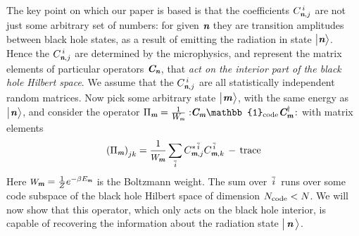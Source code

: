 \documentclass[12pt]{article}%
\def\spc{\hspace{.5pt}}
\def\be{\begin{equation}}
\def\ee{\end{equation}}
\begin{document}
The key point on which our paper is based is that the coefficients $C^{\,i}_{{ \textit{\textbf n}}, j}$ are not just some arbitrary set of numbers: for given ${ \textit{\textbf n}}$ they are transition amplitudes
between black hole states, as a result of emitting the radiation in state $\bigl|{ \textit{\textbf n}}\bigr\rangle$. Hence the $C^{\,i}_{{ \textit{\textbf n}}, j}$ are determined by the microphysics, and
represent the matrix elements of particular operators $\mbox{\textit{\textbf{C}\!\,}}_{ \textit{\textbf n}}$, that {\it act on the interior part of the black hole Hilbert space}. We assume that the $C^{\,i}_{{ \textit{\textbf n}}, j}$ are all statistically independent random matrices.
Now pick some arbitrary state $\bigl|\spc \mom\spc \ra$, with the same energy as $\bigl|\spc \nom \spc \ra$, and consider
 the operator $\Pi_{\mom} = \frac{1}{\pp_\mom} :\!\! \cC_\mom \mathbb{1}_{\rm code} \cC^\dag_\mom\! :$ with matrix elements
\be
\label{pimats}
\left(\Pi_{\mom}\right)_{jk}= {1\over \pp_\mom} \sum_{\overline{i}} C^{*\, \overline{i}}_{\mom,j} C^{\, \overline{i}}_{\mom,k}  \, -\,
{\rm trace}
\ee
Here $\pp_\mom = \frac 1 Z e^{-\beta E_\mom}$ is the Boltzmann weight. 
The sum over ${\, {\overline{i}}\, }$ runs over some code subspace of the black hole Hilbert space of dimension ${N_{\rm code}} < N$. We will now show that this operator, which only
acts on the black hole interior, is capable of recovering the information about the radiation state $\bigl|\, { \textit{\textbf n}}\,\bigr\rangle$. 
\end{document}
